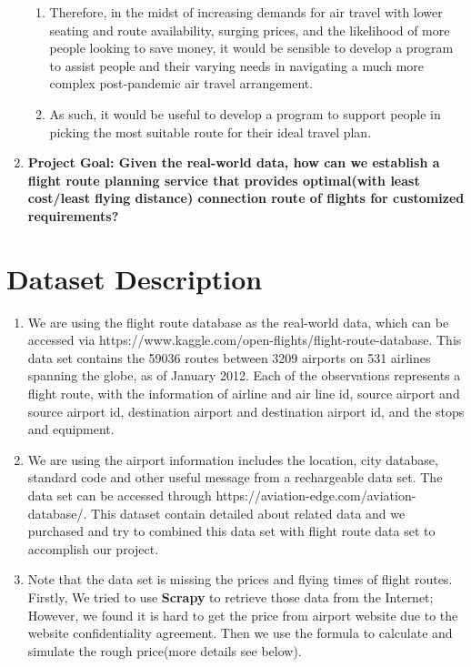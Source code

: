 \documentclass[fontsize=11pt]{article}
\begin{document}
\begin{enumerate}
\begin{enumerate}
            \item Therefore, in the midst of increasing demands for air travel with lower seating and route availability, surging prices, and the likelihood of more people looking to save money, it would be sensible to develop a program to assist people and their varying needs in navigating a much more complex post-pandemic air travel arrangement.
            
            \item As such, it would be useful to develop a program to support people in picking the most suitable route for their ideal travel plan.

        \end{enumerate}
    \item \textbf{Project Goal: Given the real-world data, how can we establish a flight route planning service that provides optimal(with least cost/least flying distance) connection route of flights for customized requirements?}

\end{enumerate}
\section*{Dataset Description}
\begin{enumerate}
    \item We are using the flight route database as the real-world data, which can be accessed via https://www.kaggle.com/open-flights/flight-route-database. This data set contains the 59036 routes between 3209 airports on 531 airlines spanning the globe, as of January 2012. Each of the observations represents a flight route, with the information of airline and air line id, source airport and source airport id, destination airport and destination airport id, and the stops and equipment\cite{Dataset}.  
    \item We are using the airport information includes the location, city database, standard code and other useful message from a rechargeable data set. The data set can be accessed through https://aviation-edge.com/aviation-database/. This dataset contain detailed about related data and we purchased and try to combined this data set with flight route data set to accomplish our project.
    \item Note that the data set is missing the prices and flying times of flight routes. Firstly, We tried to use \textbf{Scrapy} to retrieve those data from the Internet; However, we found it is hard to get the price from airport website due to the website confidentiality agreement. Then we use the formula to calculate and simulate the rough price(more details see below).
\end{enumerate}
\end{document}
